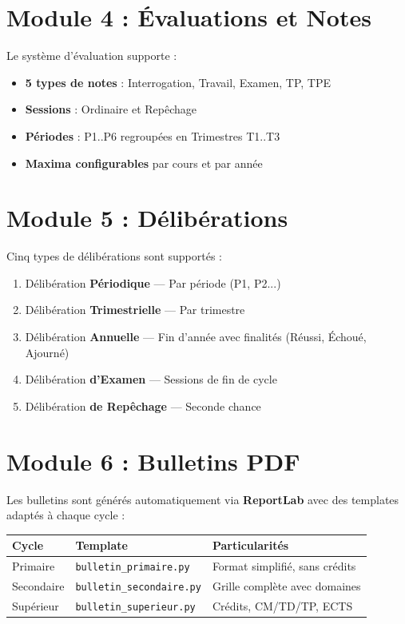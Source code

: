 \documentclass[12pt,a4paper,oneside]{report}
\begin{document}
\section{Module 4 : Évaluations et Notes}

Le système d'évaluation supporte :
\begin{itemize}
  \item \textbf{5 types de notes} : Interrogation, Travail, Examen, TP, TPE
  \item \textbf{Sessions} : Ordinaire et Repêchage
  \item \textbf{Périodes} : P1..P6 regroupées en Trimestres T1..T3
  \item \textbf{Maxima configurables} par cours et par année
\end{itemize}

\section{Module 5 : Délibérations}

Cinq types de délibérations sont supportés :
\begin{enumerate}
  \item Délibération \textbf{Périodique} — Par période (P1, P2...)
  \item Délibération \textbf{Trimestrielle} — Par trimestre
  \item Délibération \textbf{Annuelle} — Fin d'année avec finalités (Réussi, Échoué, Ajourné)
  \item Délibération \textbf{d'Examen} — Sessions de fin de cycle
  \item Délibération \textbf{de Repêchage} — Seconde chance
\end{enumerate}

\section{Module 6 : Bulletins PDF}

Les bulletins sont générés automatiquement via \textbf{ReportLab} avec des templates adaptés à chaque cycle :

\begin{center}
\begin{tabular}{l l l}
\toprule
\textbf{Cycle} & \textbf{Template} & \textbf{Particularités} \\
\midrule
Primaire & \texttt{bulletin\_primaire.py} & Format simplifié, sans crédits \\
Secondaire & \texttt{bulletin\_secondaire.py} & Grille complète avec domaines \\
Supérieur & \texttt{bulletin\_superieur.py} & Crédits, CM/TD/TP, ECTS \\
\bottomrule
\end{tabular}
\end{center}
\end{document}
